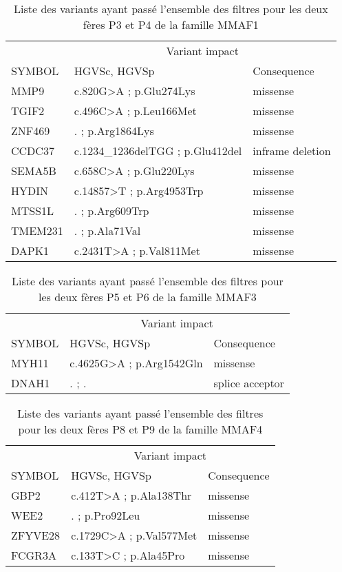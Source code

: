 \documentclass[12pt,twoside]{reedthesis}
\theoremstyle{definition}
\theoremstyle{definition}
\theoremstyle{remark}
\begin{document}
  \begin{longtable}[t]{lll}
  \caption{\label{tab:tabmmaf2}Liste des variants ayant passé l'ensemble des filtres pour les deux fères P3 et P4 de la famille MMAF1}\\
  \toprule
  \multicolumn{1}{c}{ } & \multicolumn{2}{c}{Variant impact} \\
  \cmidrule(l{2pt}r{2pt}){2-3}
  SYMBOL & HGVSc, HGVSp & Consequence\\
  \midrule
  MMP9 & c.820G>A ; p.Glu274Lys & missense\\
  TGIF2 & c.496C>A ; p.Leu166Met & missense\\
  ZNF469 & . ; p.Arg1864Lys & missense\\
  CCDC37 & c.1234\_1236delTGG ; p.Glu412del & inframe deletion\\
  SEMA5B & c.658C>A ; p.Glu220Lys & missense\\
  \addlinespace
  HYDIN & c.14857>T ; p.Arg4953Trp & missense\\
  MTSS1L & . ; p.Arg609Trp & missense\\
  TMEM231 & . ; p.Ala71Val & missense\\
  DAPK1 & c.2431T>A ; p.Val811Met & missense\\
  \bottomrule
  \end{longtable}
  
  \begin{longtable}[t]{lll}
  \caption{\label{tab:tabmmaf3}Liste des variants ayant passé l'ensemble des filtres pour les deux fères P5 et P6 de la famille MMAF3}\\
  \toprule
  \multicolumn{1}{c}{ } & \multicolumn{2}{c}{Variant impact} \\
  \cmidrule(l{2pt}r{2pt}){2-3}
  SYMBOL & HGVSc, HGVSp & Consequence\\
  \midrule
  MYH11 & c.4625G>A ; p.Arg1542Gln & missense\\
  DNAH1 & . ; . & splice acceptor\\
  \bottomrule
  \end{longtable}
  
  \begin{longtable}[t]{lll}
  \caption{\label{tab:tabmmaf4}Liste des variants ayant passé l'ensemble des filtres pour les deux fères P8 et P9 de la famille MMAF4}\\
  \toprule
  \multicolumn{1}{c}{ } & \multicolumn{2}{c}{Variant impact} \\
  \cmidrule(l{2pt}r{2pt}){2-3}
  SYMBOL & HGVSc, HGVSp & Consequence\\
  \midrule
  GBP2 & c.412T>A ; p.Ala138Thr & missense\\
  WEE2 & . ; p.Pro92Leu & missense\\
  ZFYVE28 & c.1729C>A ; p.Val577Met & missense\\
  FCGR3A & c.133T>C ; p.Ala45Pro & missense\\
  \bottomrule
  \end{longtable}
  
\end{document}
